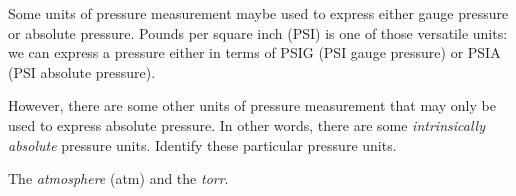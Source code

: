 

Some units of pressure measurement maybe used to express either gauge pressure or absolute pressure.  Pounds per square inch (PSI) is one of those versatile units: we can express a pressure either in terms of PSIG (PSI gauge pressure) or PSIA (PSI absolute pressure).

However, there are some other units of pressure measurement that may only be used to express absolute pressure.  In other words, there are some {\it intrinsically absolute} pressure units.  Identify these particular pressure units.







The {\it atmosphere} (atm) and the {\it torr}.










